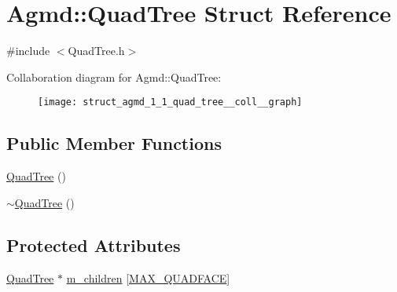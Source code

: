 \hypertarget{struct_agmd_1_1_quad_tree}{\section{Agmd\+:\+:Quad\+Tree Struct Reference}
\label{struct_agmd_1_1_quad_tree}
}


{\ttfamily \#include $<$Quad\+Tree.\+h$>$}



Collaboration diagram for Agmd\+:\+:Quad\+Tree\+:\nopagebreak
\begin{figure}[H]
\begin{center}
\leavevmode
\texttt{[image: struct\_agmd\_1\_1\_quad\_tree\_\_coll\_\_graph]}
\end{center}
\end{figure}
\subsection*{Public Member Functions}
\begin{DoxyCompactItemize}
\item 
\hyperlink{struct_agmd_1_1_quad_tree_a6c50cdb288a5df70ddfa8e241c33259e}{Quad\+Tree} ()
\item 
\hyperlink{struct_agmd_1_1_quad_tree_a20bc614730a3baea708dd10e2226bccb}{$\sim$\+Quad\+Tree} ()
\end{DoxyCompactItemize}
\subsection*{Protected Attributes}
\begin{DoxyCompactItemize}
\item 
\hyperlink{struct_agmd_1_1_quad_tree}{Quad\+Tree} $\ast$ \hyperlink{struct_agmd_1_1_quad_tree_a8915de21c8dac00382b960af402a871c}{m\+\_\+children} \mbox{[}\hyperlink{_quad_tree_8h_a6da02e504496031b6849288af10ff677}{M\+A\+X\+\_\+\+Q\+U\+A\+D\+F\+A\+C\+E}\mbox{]}
\end{DoxyCompactItemize}


